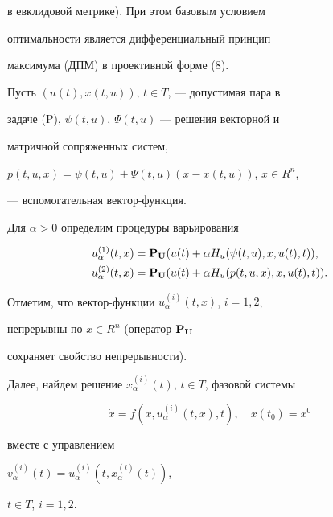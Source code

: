 в евклидовой метрике). При этом базовым условием


оптимальности является дифференциальный принцип 


максимума (ДПМ) в проективной форме (8).





Пусть $(u(t),x(t,u))$, $t \in T$, --- допустимая пара в 


задаче (P), $\psi(t,u)$, $\Psi(t,u)$ --- решения векторной и


матричной сопряженных систем,


$p(t,u,x)=\psi(t,u)+\Psi(t,u)(x - x(t,u))$, $x \in R^{n}$,


--- вспомогательная вектор-функция.





Для $\alpha>0$ определим процедуры варьирования


\begin{align}


u_{\alpha}^{(1)}(t,x)&={\bold{P}_{\bold U}}(u(t)+


\alpha H_{u}(\psi(t,u), x, u(t), t)),\\


u_{\alpha}^{(2)}(t,x)&={\bold{P}_{\bold U}}(u(t)+


\alpha H_{u}(p(t,u,x), x, u(t), t)).


\end{align}


Отметим, что вектор-функции $u_{\alpha}^{(i)}(t,x)$, $i=1, 2$,


непрерывны по $x \in R^{n}$ (оператор $ \bold{P}_{\bold U}$


сохраняет свойство непрерывности).





Далее, найдем решение $x_{\alpha}^{(i)}(t)$, $t \in T$, фазовой системы


\begin{equation}


\Dot{x}=f(x, u_{\alpha}^{(i)}(t,x), t),\quad x(t_{0})=x^{0}


\end{equation}


вместе с управлением


$v_{\alpha}^{(i)}(t)=u_{\alpha}^{(i)}(t, x_{\alpha}^{(i)}(t))$,


$t \in T$, $i=1, 2$.





